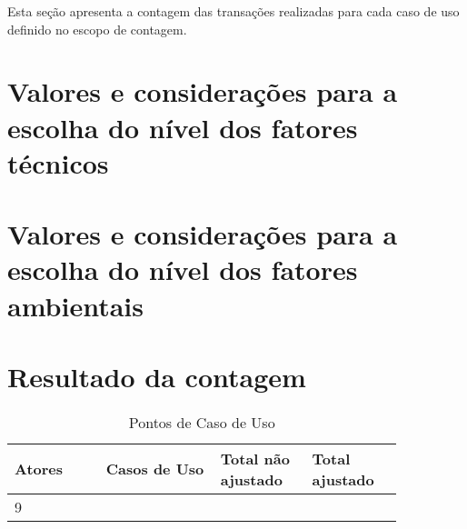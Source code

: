   Esta seção apresenta a contagem das transações realizadas para cada caso de uso definido no escopo de contagem.

  

\section{Valores e considerações para a escolha do nível dos fatores técnicos}

\section{Valores e considerações para a escolha do nível dos fatores ambientais}

\pagebreak
\section{Resultado da contagem}

\begin{table*}[!h]
\centering
\caption{Pontos de Caso de Uso}
\label{Rotulo}
  \begin{tabular}{|p{0.20\linewidth}|p{0.25\linewidth}|p{0.20\linewidth}|p{0.20\linewidth}|}
  \hline
  \textbf{Atores} & \textbf{Casos de Uso} & \textbf{Total não ajustado} & \textbf{Total ajustado} \\ 
  \hline

  9 & & &\\
  \hline
  \end{tabular}
\end{table*}

  

